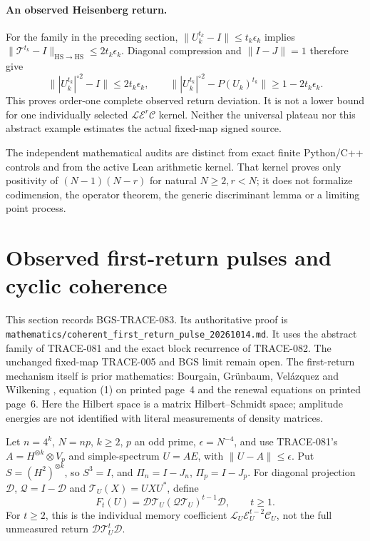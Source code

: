\paragraph{An observed Heisenberg return.}
For the family in the preceding section,
\(\|U_k^{t_k}-I\|\le t_k\epsilon_k\) implies
\(\|\mathcal T^{t_k}-I\|_{\mathrm{HS}\to\mathrm{HS}}
 \le2t_k\epsilon_k\).
Diagonal compression and \(\|I-J\|=1\) therefore give
\[
\bigl\||U_k^{t_k}|^{\circ2}-I\bigr\|\le2t_k\epsilon_k,\qquad
\bigl\||U_k^{t_k}|^{\circ2}-P(U_k)^{t_k}\bigr\|
       \ge1-2t_k\epsilon_k .
\]
This proves order-one complete observed return deviation.  It is not
a lower bound for one individually selected
\(\mathcal L\mathcal E^r\mathcal C\) kernel.  Neither the universal
plateau nor this abstract example estimates the actual fixed-map
signed source.

The independent mathematical audits are distinct from exact finite
Python/C++ controls and from the active Lean arithmetic kernel.
That kernel proves only positivity of \((N-1)(N-r)\) for natural
\(N\ge2,r<N\); it does not formalize codimension, the operator theorem,
the generic discriminant lemma or a limiting point process.

\section{Observed first-return pulses and cyclic coherence}
\label{sec:observed-first-return-20261014}

This section records BGS-TRACE-083. Its authoritative proof is
\texttt{mathematics/coherent\_first\_return\_pulse\_20261014.md}.
It uses the abstract family of TRACE-081 and the exact block recurrence
of TRACE-082. The unchanged fixed-map TRACE-005 and BGS limit remain open.
The first-return mechanism itself is prior mathematics:
Bourgain, Gr\"unbaum, Vel\'azquez and Wilkening
\cite{BourgainGrunbaumVelazquezWilkening2013Returns}, equation (1) on
printed page~4 and the renewal equations on printed page~6.
Here the Hilbert space is a matrix Hilbert--Schmidt space; amplitude
energies are not identified with literal measurements of density matrices.

Let \(n=4^k\), \(N=np\), \(k\ge2\), \(p\) an odd prime,
\(\epsilon=N^{-4}\), and use TRACE-081's
\(A=H^{\otimes k}\otimes V_p\) and simple-spectrum \(U=AE\),
with \(\|U-A\|\le\epsilon\).
Put \(S=(H^2)^{\otimes k}\), so \(S^3=I\), and
\(\Pi_n=I-J_n\), \(\Pi_p=I-J_p\).
For diagonal projection \(\mathcal D\), \(\mathcal Q=I-\mathcal D\)
and \(\mathcal T_U(X)=UXU^*\), define
\[
 F_t(U)=\mathcal D\mathcal T_U
           (\mathcal Q\mathcal T_U)^{t-1}\mathcal D,\qquad t\ge1.
\]
For \(t\ge2\), this is the individual memory coefficient
\(\mathcal L_U\mathcal E_U^{t-2}\mathcal C_U\), not the full
unmeasured return \(\mathcal D\mathcal T_U^t\mathcal D\).

